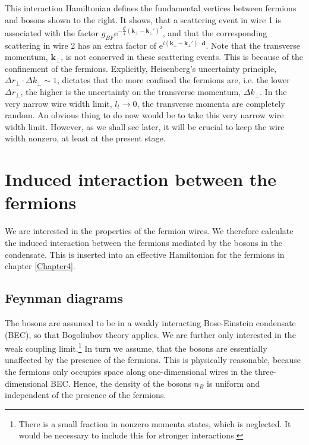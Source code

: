 This interaction Hamiltonian defines the fundamental vertices between fermions and bosons shown to the right. It shows, that a scattering event in wire 1 is associated with the factor $g_{BF} \text{e}^{-\frac{l_t^2}{4}(\mathbf{k}_\perp - \mathbf{k}_\perp')^2}$, and that the corresponding scattering in wire 2 has an extra factor of $\text{e}^{i(\mathbf{k}_\perp - \mathbf{k}_\perp')\cdot \mathbf{d}}$. Note that the transverse momentum, $\mathbf{k}_{\perp}$, is not conserved in these scattering events. This is because of the confinement of the fermions. Explicitly, Heisenberg's uncertainty principle, $\Delta r_{\perp} \cdot \Delta k_{\perp} \sim 1$, dictates that the more confined the fermions are, i.e. the lower $\Delta r_{\perp}$, the higher is the uncertainty on the transverse momentum, $\Delta k_{\perp}$. In the very narrow wire width limit, $l_t \to 0$, the transverse momenta are completely random. An obvious thing to do now would be to take this very narrow wire width limit. However, as we shall see later, it will be crucial to keep the wire width nonzero, at least at the present stage.  

\section{Induced interaction between the fermions} \label{sec.1D3Dinducedinteraction}
We are interested in the properties of the fermion wires. We therefore calculate the induced interaction between the fermions mediated by the bosons in the condensate. This is inserted into an effective Hamiltonian for the fermions in chapter \ref{Chapter4}.

\subsection{Feynman diagrams} \label{subsec.Feynmandiagrams}
The bosons are assumed to be in a weakly interacting Bose-Einstein condensate (BEC), so that Bogoliubov theory applies. We are further only interested in the weak coupling limit.\footnote{There is a small fraction in nonzero momenta states, which is neglected. It would be necessary to include this for stronger interactions.} In turn we assume, that the bosons are essentially unaffected by the presence of the fermions. This is physically reasonable, because the fermions only occupies space along one-dimensional wires in the three-dimensional BEC. Hence, the density of the bosons $n_B$ is uniform and independent of the presence of the fermions. 

